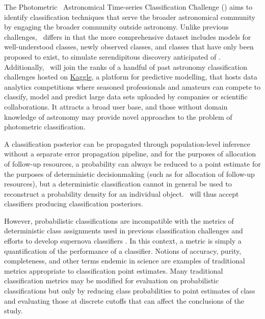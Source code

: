 The Photometric \lsst\ Astronomical Time-series Classification Challenge (\plasticc) aims to identify classification techniques that serve the broader astronomical community by engaging the broader community outside astronomy.
Unlike previous challenges, \plasticc\ differs in that the more comprehensive dataset includes models for well-understood classes, newly observed classes, and classes that have only been proposed to exist, to simulate serendipitous discovery anticipated of \lsst.
Additionally, \plasticc\ will join the ranks of a handful of past astronomy classification challenges hosted on \href{https://www.kaggle.com/competitions}{Kaggle}, a platform for predictive modelling, that hosts data analytics competitions where seasoned professionals and amateurs can compete to classify, model and predict large data sets uploaded by companies or scientific collaborations.
It attracts a broad user base, and those without domain knowledge of astronomy may provide novel approaches to the problem of photometric classification.

A classification posterior can be propagated through population-level inference without a separate error propagation pipeline, and for the purposes of allocation of follow-up resources, a probability can always be reduced to a point estimate for the purposes of deterministic decisionmaking (such as for allocation of follow-up resources), but a deterministic classification cannot in general be used to reconstruct a probability density for an individual object.
\plasticc\ will thus accept classifiers producing classification posteriors.

However, probabilistic classifications are incompatible with the metrics of deterministic class assignments used in previous classification challenges \citep{kessler_supernova_2010, kessler_results_2010} and efforts to develop supernova classifiers \citep{2018ApJS..236....9N}.
In this context, a metric is simply a quantification of the performance of a classifier.
Notions of accuracy, purity, completeness, and other terms endemic in science are examples of traditional metrics appropriate to classification point estimates.
Many traditional classification metrics may be modified for evaluation on probabilistic classifications \citep{lochner_photometric_2016, moller_photometric_2016, hon_deep_2017, hon_detecting_2018, 2011arXiv1108.4696G} but only by reducing class probabilities to point estimates of class and evaluating those at discrete cutoffs that can affect the conclusions of the study.

